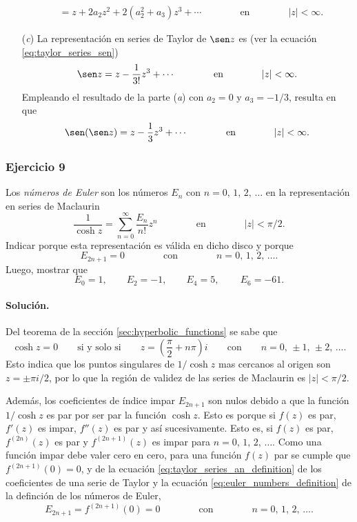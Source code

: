 \documentclass[a4paper]{report}
\begin{document}
\begin{enumerate}
\begin{align*}
    &=z+2a_2z^2+2(a_2^2+a_3)z^3+\cdots
    \qquad\qquad\textrm{en}\qquad\qquad
  |z|<\infty.
 \end{align*}
\item[(\textit{c})] La representación en series de Taylor de \(\sen z\) es (ver la ecuación \ref{eq:taylor_series_sen})
\[
 \sen z=z-\frac{1}{3!}z^3+\cdots 
 \qquad\qquad\textrm{en}\qquad\qquad
  |z|<\infty.
\]
Empleando el resultado de la parte (\textit{a}) con \(a_2=0\) y \(a_3=-1/3\), resulta en que 
\begin{align*}
 \sen(\sen z)=z-\frac{1}{3}z^3+\cdots 
 \qquad\qquad\textrm{en}\qquad\qquad
  |z|<\infty.
\end{align*}
\end{enumerate}

\subsubsection*{Ejercicio 9}

Los \emph{números de Euler} son los números \(E_n\) con \(n=0,\,1,\,2,\,\dots\) en la representación en series de Maclaurin
\begin{equation}\label{eq:euler_numbers_definition}
 \frac{1}{\cosh z}=\sum_{n=0}^\infty\frac{E_n}{n!}z^n
 \qquad\qquad\textrm{en}\qquad\qquad
  |z|<\pi/2. 
\end{equation}
Indicar porque esta representación es válida en dicho disco y porque 
\[
 E_{2n+1}=0
 \qquad\qquad\textrm{con}\qquad\qquad
  n=0,\,1,\,2,\,\dots.
\]
Luego, mostrar que 
\[
 E_0=1,\qquad 
 E_2=-1,\qquad 
 E_4=5,\,\qquad 
 E_6=-61.
\]

\paragraph{Solución.} Del teorema de la sección \ref{sec:hyperbolic_functions} se sabe que 
\[
 \cosh z=0
 \qquad\textrm{si y solo si}\qquad
 z=\left(\frac{\pi}{2}+n\pi\right)i
 \qquad\textrm{con}\qquad 
 n=0,\,\pm1,\,\pm2,\,\dots.
\]
Esto indica que los puntos singulares  de \(1/\cosh z\) mas cercanos al origen son \(z=\pm\pi i/2\), por lo que la región de validez de las series de Maclaurin es \(|z|<\pi/2\).

Además, los coeficientes de índice impar \(E_{2n+1}\) son nulos debido a que la función \(1/\cosh z\) es par por ser par la función \(\cosh z\). Esto es porque si \(f(z)\) es par, \(f'(z)\) es impar, \(f''(z)\) es par y así sucesivamente. Esto es, si \(f(z)\) es par, \(f^{(2n)}(z)\) es par y \(f^{(2n+1)}(z)\) es impar para \(n=0,\,1,\,2,\,\dots\). Como una función impar debe valer cero en cero, para una función \(f(z)\) par se cumple que \(f^{(2n+1)}(0)=0\), 
y de la ecuación \ref{eq:taylor_series_an_definition} de los coeficientes de una serie de Taylor y la ecuación \ref{eq:euler_numbers_definition} de la definción de los números de Euler,
\[
 E_{2n+1}=f^{(2n+1)}(0)=0
 \qquad\qquad\textrm{con}\qquad\qquad
 n=0,\,1,\,2,\,\dots.
\]
\end{document}
